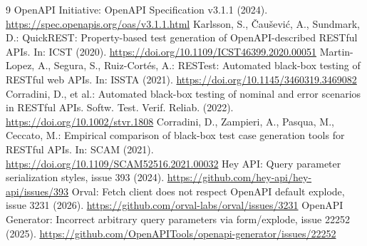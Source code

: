\documentclass[runningheads]{llncs}
\begin{document}
\begin{thebibliography}{9}
 OpenAPI Initiative: OpenAPI Specification v3.1.1 (2024). \url{https://spec.openapis.org/oas/v3.1.1.html}
 Karlsson, S., \v{C}au\v{s}evi\'c, A., Sundmark, D.: QuickREST: Property-based test generation of OpenAPI-described RESTful APIs. In: ICST (2020). \url{https://doi.org/10.1109/ICST46399.2020.00051}
 Martin-Lopez, A., Segura, S., Ruiz-Cort\'es, A.: RESTest: Automated black-box testing of RESTful web APIs. In: ISSTA (2021). \url{https://doi.org/10.1145/3460319.3469082}
 Corradini, D., et al.: Automated black-box testing of nominal and error scenarios in RESTful APIs. Softw. Test. Verif. Reliab. (2022). \url{https://doi.org/10.1002/stvr.1808}
 Corradini, D., Zampieri, A., Pasqua, M., Ceccato, M.: Empirical comparison of black-box test case generation tools for RESTful APIs. In: SCAM (2021). \url{https://doi.org/10.1109/SCAM52516.2021.00032}
 Hey API: Query parameter serialization styles, issue 393 (2024). \url{https://github.com/hey-api/hey-api/issues/393}
 Orval: Fetch client does not respect OpenAPI default explode, issue 3231 (2026). \url{https://github.com/orval-labs/orval/issues/3231}
 OpenAPI Generator: Incorrect arbitrary query parameters via form/explode, issue 22252 (2025). \url{https://github.com/OpenAPITools/openapi-generator/issues/22252}
\end{thebibliography}
\end{document}
